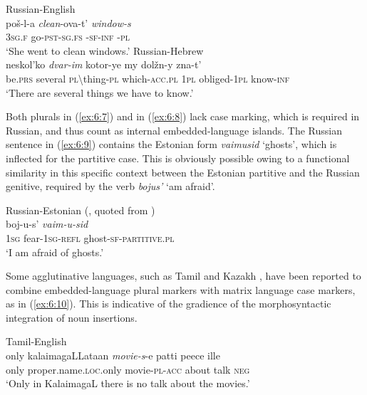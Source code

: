\ea
\label{ex:6:7}
Russian-English \citep[173]{benson}\\
 {poš-l-a} \textit{clean}-ova-t' \textit{window-s}\\
	\textsc{3sg.f} go-\textsc{pst-sg.fs} \phantom{mmn}-\textsc{sf-inf} \phantom{mmmm}-\textsc{pl}\\
\glt `She went to clean windows.'
\ex
\label{ex:6:8}
Russian-Hebrew \citep[48]{naiditch08}\\
 {neskol'ko} \textit{dvar-im} {kotor-ye} {my} {dolžn-y} {zna-t'}\\
	be.\textsc{prs} several \textsc{pl}\textbackslash thing-\textsc{pl} which-\textsc{acc.pl} \textsc{1pl} obliged-\textsc{1pl} know-\textsc{inf}\\
\glt `There are several things we have to know.'
\z

\noindent Both plurals in (\ref{ex:6:7}) and in (\ref{ex:6:8}) lack case marking, which is required in Russian, and thus count as internal embedded-language islands. The Russian sentence in (\ref{ex:6:9}) contains the Estonian form \textit{vaimusid} ‘ghosts’, which is inflected for the partitive case. This is obviously possible owing to a functional similarity in this specific context between the Estonian partitive and the Russian genitive, required by the verb \textit{bojus’} ‘am afraid’.

\ea
\label{ex:6:9}
Russian-Estonian (\citealt[117]{muerkhein}, quoted from \citealt[437]{verschik04})\\
 {boj-u-s'} \textit{vaim-u-sid}\\
	\textsc{1sg} fear-\textsc{1sg-refl} ghost-\textsc{sf-partitive.pl}\\
\glt `I am afraid of ghosts.'
\z

Some agglutinative languages, such as Tamil and Kazakh \citep[67]{muhamedowa-untersuchung-2006}, have been reported to combine  embedded-language plural markers with matrix language case markers, as in (\ref{ex:6:10}). This is indicative of the gradience of the morphosyntactic integration of noun insertions.

\ea
\label{ex:6:10}
Tamil-English \citep[81]{sankoff-et-al-1990}\\
\gll only {kalaimagaLLataan} \textit{movie-s}-e {patti} {peece} {ille}\\
	only proper.name.\textsc{loc}.only movie-\textsc{pl-acc} about talk \textsc{neg}\\
\glt `Only in KalaimagaL there is no talk about the movies.'
\z

